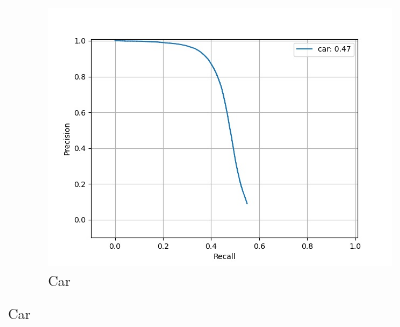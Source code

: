 \begin{figure}[H]
\begin{subfigure}[t]{0.325\textwidth}
    		\includegraphics[width=\textwidth]{images/sub_ens_pr/class_car_pr.jpg}
    		\caption{Car}
    	\end{subfigure}
    	
    		 \end{figure}
        	
